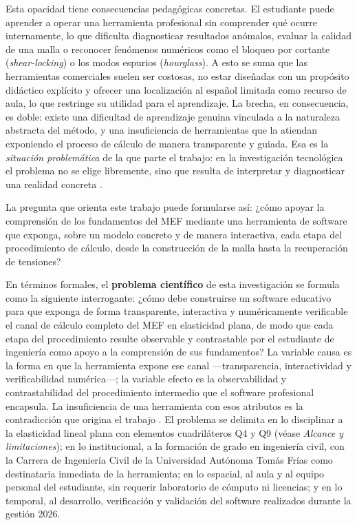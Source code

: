 Esta opacidad tiene consecuencias pedagógicas concretas. El estudiante puede aprender a operar una herramienta profesional sin comprender qué ocurre internamente, lo que dificulta diagnosticar resultados anómalos, evaluar la calidad de una malla o reconocer fenómenos numéricos como el bloqueo por cortante (\emph{shear-locking}) o los modos espurios (\emph{hourglass}). A esto se suma que las herramientas comerciales suelen ser costosas, no estar diseñadas con un propósito didáctico explícito \autocite[p.~1160]{perezsantiago2023fem} y ofrecer una localización al español limitada como recurso de aula, lo que restringe su utilidad para el aprendizaje. La brecha, en consecuencia, es doble: existe una dificultad de aprendizaje genuina vinculada a la naturaleza abstracta del método, y una insuficiencia de herramientas que la atiendan exponiendo el proceso de cálculo de manera transparente y guiada. Esa es la \emph{situación problemática} de la que parte el trabajo: en la investigación tecnológica el problema no se elige libremente, sino que resulta de interpretar y diagnosticar una realidad concreta \autocite{garciacordoba2005tecnologica}.

La pregunta que orienta este trabajo puede formularse así: ¿cómo apoyar la comprensión de los fundamentos del MEF mediante una herramienta de software que exponga, sobre un modelo concreto y de manera interactiva, cada etapa del procedimiento de cálculo, desde la construcción de la malla hasta la recuperación de tensiones?

En términos formales, el \textbf{problema científico} de esta investigación se formula como la siguiente interrogante: ¿cómo debe construirse un software educativo para que exponga de forma transparente, interactiva y numéricamente verificable el canal de cálculo completo del MEF en elasticidad plana, de modo que cada etapa del procedimiento resulte observable y contrastable por el estudiante de ingeniería como apoyo a la comprensión de sus fundamentos? La variable causa es la forma en que la herramienta expone ese canal —transparencia, interactividad y verificabilidad numérica—; la variable efecto es la observabilidad y contrastabilidad del procedimiento intermedio que el software profesional encapsula. La insuficiencia de una herramienta con esos atributos es la contradicción que origina el trabajo \autocite{alvarez_metodologia}. El problema se delimita en lo disciplinar a la elasticidad lineal plana con elementos cuadriláteros Q4 y Q9 (véase \emph{Alcance y limitaciones}); en lo institucional, a la formación de grado en ingeniería civil, con la Carrera de Ingeniería Civil de la Universidad Autónoma Tomás Frías como destinataria inmediata de la herramienta; en lo espacial, al aula y al equipo personal del estudiante, sin requerir laboratorio de cómputo ni licencias; y en lo temporal, al desarrollo, verificación y validación del software realizados durante la gestión 2026.

